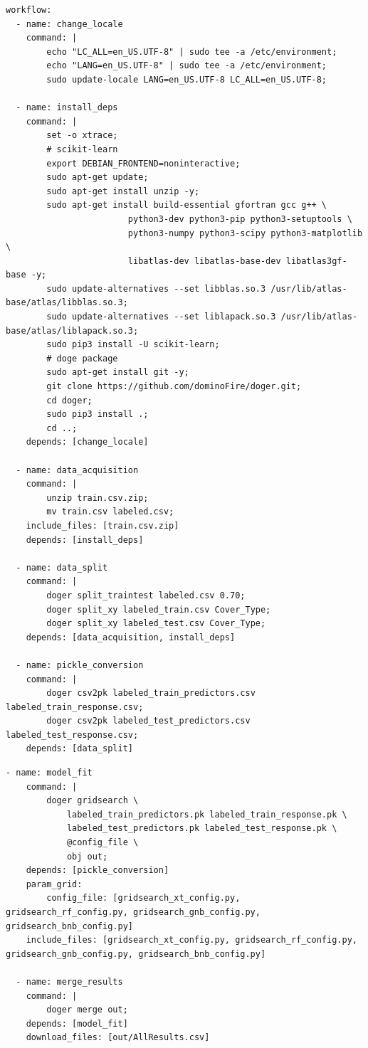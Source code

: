 \begin{lstlisting}[label={code:forests_1},caption={Flujo de trabajo para búsqueda de parámetros \emph{forests} (parte 1).},float]
workflow:
  - name: change_locale
    command: |
        echo "LC_ALL=en_US.UTF-8" | sudo tee -a /etc/environment;
        echo "LANG=en_US.UTF-8" | sudo tee -a /etc/environment;
        sudo update-locale LANG=en_US.UTF-8 LC_ALL=en_US.UTF-8;

  - name: install_deps
    command: |
        set -o xtrace;
        # scikit-learn
        export DEBIAN_FRONTEND=noninteractive;
        sudo apt-get update;
        sudo apt-get install unzip -y;
        sudo apt-get install build-essential gfortran gcc g++ \
                        python3-dev python3-pip python3-setuptools \
                        python3-numpy python3-scipy python3-matplotlib \
                        libatlas-dev libatlas-base-dev libatlas3gf-base -y;
        sudo update-alternatives --set libblas.so.3 /usr/lib/atlas-base/atlas/libblas.so.3;
        sudo update-alternatives --set liblapack.so.3 /usr/lib/atlas-base/atlas/liblapack.so.3;
        sudo pip3 install -U scikit-learn;
        # doge package
        sudo apt-get install git -y;
        git clone https://github.com/dominoFire/doger.git;
        cd doger;
        sudo pip3 install .;
        cd ..;
    depends: [change_locale]

  - name: data_acquisition
    command: |
        unzip train.csv.zip;
        mv train.csv labeled.csv;
    include_files: [train.csv.zip]
    depends: [install_deps]

  - name: data_split
    command: |
        doger split_traintest labeled.csv 0.70;
        doger split_xy labeled_train.csv Cover_Type;
        doger split_xy labeled_test.csv Cover_Type;
    depends: [data_acquisition, install_deps]

  - name: pickle_conversion
    command: |
        doger csv2pk labeled_train_predictors.csv labeled_train_response.csv;
        doger csv2pk labeled_test_predictors.csv labeled_test_response.csv;
    depends: [data_split]
\end{lstlisting}

\begin{lstlisting}[label={code:forests_2},caption={Flujo de trabajo para búsqueda de parámetros \emph{forests} (parte 2).},float]
  - name: model_fit
    command: |
        doger gridsearch \
            labeled_train_predictors.pk labeled_train_response.pk \
            labeled_test_predictors.pk labeled_test_response.pk \
            @config_file \
            obj out;
    depends: [pickle_conversion]
    param_grid:
        config_file: [gridsearch_xt_config.py, gridsearch_rf_config.py, gridsearch_gnb_config.py, gridsearch_bnb_config.py]
    include_files: [gridsearch_xt_config.py, gridsearch_rf_config.py, gridsearch_gnb_config.py, gridsearch_bnb_config.py]

  - name: merge_results
    command: |
        doger merge out;
    depends: [model_fit]
    download_files: [out/AllResults.csv]
\end{lstlisting}


